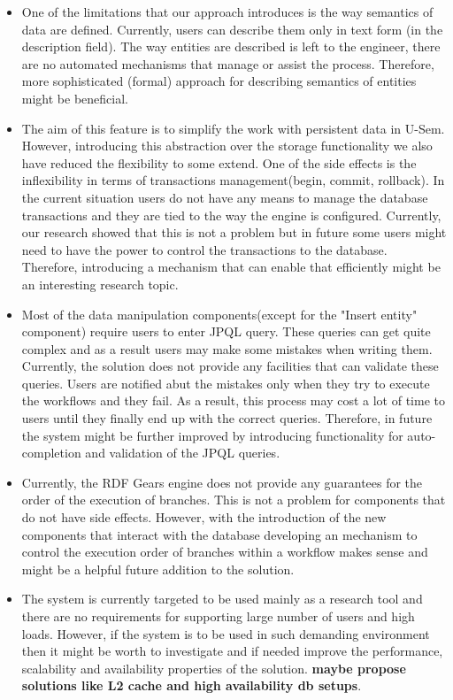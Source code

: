 \begin{itemize}
\item One of the limitations that our approach introduces is the way semantics of data are defined. Currently, users can describe them only in text form (in the description field). The way entities are described is left to the engineer, there are no automated mechanisms that manage or assist the process. Therefore, more sophisticated (formal) approach for describing semantics of entities might be beneficial.

\item The aim of this feature is to simplify the work with persistent data in U-Sem. However, introducing this abstraction over the storage functionality we also have reduced the flexibility to some extend. One of the side effects is the inflexibility in terms of transactions management(begin, commit, rollback). In the current situation users do not have any means to manage the database transactions and they are tied to the way the engine is configured. Currently, our research showed that this is not a problem but in future some users might need to have the power to control the transactions to the database. Therefore, introducing a mechanism that can enable that efficiently might be an interesting research topic.

\item Most of the data manipulation components(except for the "Insert entity" component) require users to enter JPQL query. These queries can get quite complex and as a result users may make some mistakes when writing them. Currently, the solution does not provide any facilities that can validate these queries. Users are notified abut the mistakes only when they try to execute the workflows and they fail. As a result, this process may cost a lot of time to users until they finally end up with the correct queries. Therefore, in future the system might be further improved by introducing functionality for auto-completion and validation of the JPQL queries.

\item Currently, the RDF Gears engine does not provide any guarantees for the order of the execution of branches. This is not a problem for components that do not have side effects. However, with the introduction of the new components that interact with the database developing an mechanism to control the execution order of branches within a workflow makes sense and might be a helpful future addition to the solution.

\item The system is currently targeted to be used mainly as a research tool and there are no requirements for supporting large number of users and high loads. However, if the system is to be used in such demanding environment then it might be worth to investigate and if needed improve the performance, scalability and availability properties of the solution. \textbf{maybe propose solutions like L2 cache and high availability db setups}. 

\end{itemize}

